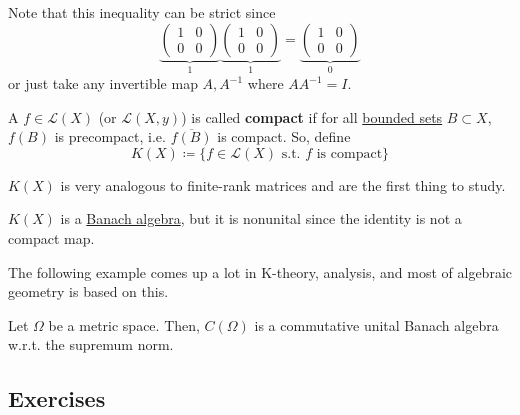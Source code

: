 	Note that this inequality can be strict since 
	\begin{equation}
		\underbrace{\begin{pmatrix} 1 & 0 \\ 0 & 0 \end{pmatrix}}_{1} \underbrace{\begin{pmatrix} 1 & 0 \\ 0 & 0 \end{pmatrix}}_{1} = \underbrace{\begin{pmatrix} 1 & 0 \\ 0 & 0 \end{pmatrix}}_{0}
	\end{equation}
	or just take any invertible map $A, A^{-1}$ where $A A^{-1} = I$. 

	\begin{definition}
	  \label{def:compact-linear-operator}
		A $f \in \mathcal{L}(X)$ (or $\mathcal{L}(X, y)$) is called \textbf{compact} if for all \hyperref[pst-def:bounded-set]{bounded sets} $B \subset X$, $f(B)$ is precompact, i.e. $\overline{f(B)}$ is compact. So, define 
		\begin{equation}
			K(X) \coloneqq \{ f \in \mathcal{L}(X) \text{ s.t. } f \text{ is compact}\}
		\end{equation}
	\end{definition}

	$K(X)$ is very analogous to finite-rank matrices and are the first thing to study. 

	\begin{theorem}
	  \label{thm:compact-linear-endomorphisms-are-banach-algebra}
	  $K(X)$ is a \hyperref[def:banach-algebra]{Banach algebra}, but it is nonunital since the identity is not a compact map. 
	\end{theorem}

	The following example comes up a lot in K-theory, analysis, and most of algebraic geometry is based on this. 

	\begin{example}
	  \label{ex:comega-as-a-commutative-unital-banach-algebra}
	  Let $\Omega$ be a metric space. Then, $C(\Omega)$ is a commutative unital Banach algebra w.r.t. the supremum norm. 
	\end{example}

\subsection{Exercises} 


